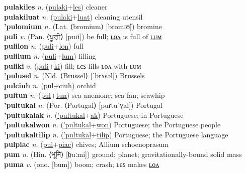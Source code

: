 \textbf{pulakiles} \textit{n.} (\hyperref[pulaki]{pulaki}+\hyperref[les]{les})
cleaner \label{pulakiles} \\
\textbf{pulakiluat} \textit{n.} (\hyperref[pulaki]{pulaki}+\hyperref[luat]{luat})
cleaning utensil \label{pulakiluat} \\
\textbf{'pulomium} \textit{n.} (Lat. ⟨bromium⟩ [bromɪʊ̃])
bromine \label{'pulomium} \\
\textbf{puli} \textit{v.} (Pan. ⟨ਪੂਰੀ⟩ [puɾi])
be full; \hyperref[pulilon]{ʟᴏᴧ} is full of \hyperref[pulilum]{ʟᴜᴍ} \label{puli} \\
\textbf{pulilon} \textit{n.} (\hyperref[puli]{puli}+\hyperref[lon]{lon})
full \label{pulilon} \\
\textbf{pulilum} \textit{n.} (\hyperref[puli]{puli}+\hyperref[lum]{lum})
filling \label{pulilum} \\
\textbf{puliki} \textit{v.} (\hyperref[puli]{puli}+\hyperref[ki]{ki})
fill; ʟєꜱ fills ʟᴏᴧ with ʟᴜᴍ \label{puliki} \\
\textbf{'pulusel} \textit{n.} (Nld. ⟨Brussel⟩ [ˈbrʏsəl])
Brussels \label{'pulusel} \\
\textbf{pulciuh} \textit{n.} (\hyperref[pul]{pul}+\hyperref[ciuh]{ciuh})
orchid \label{pulciuh} \\
\textbf{pultun} \textit{n.} (\hyperref[pul]{pul}+\hyperref[tun]{tun})
sea anemone; sea fan; seawhip \label{pultun} \\
\textbf{'pultukal} \textit{n.} (Por. ⟨Portugal⟩ [puɾtuˈɣal])
Portugal \label{'pultukal} \\
\textbf{'pultukalak} \textit{n.} (\hyperref['pultukal]{'pultukal}+\hyperref[ak]{ak})
Portuguese; in Portuguese \label{'pultukalak} \\
\textbf{'pultukalwon} \textit{n.} (\hyperref['pultukal]{'pultukal}+\hyperref[won]{won})
Portuguese; the Portuguese people \label{'pultukalwon} \\
\textbf{'pultukaltilip} \textit{n.} (\hyperref['pultukal]{'pultukal}+\hyperref[tilip]{tilip})
Portuguese; the Portuguese language \label{'pultukaltilip} \\
\textbf{pulpiac} \textit{n.} (\hyperref[pul]{pul}+\hyperref[piac]{piac})
chives; Allium schoenoprasum \label{pulpiac} \\
\textbf{pum} \textit{n.} (Hin. ⟨भूमि⟩ [b̤uːmi])
ground; planet; gravitationally-bound solid mass \label{pum} \\
\textbf{puma} \textit{v.} (ono. [bum])
boom; crash; ʟєꜱ makes \hyperref[pumalon]{ʟᴏᴧ} \label{puma} \\
